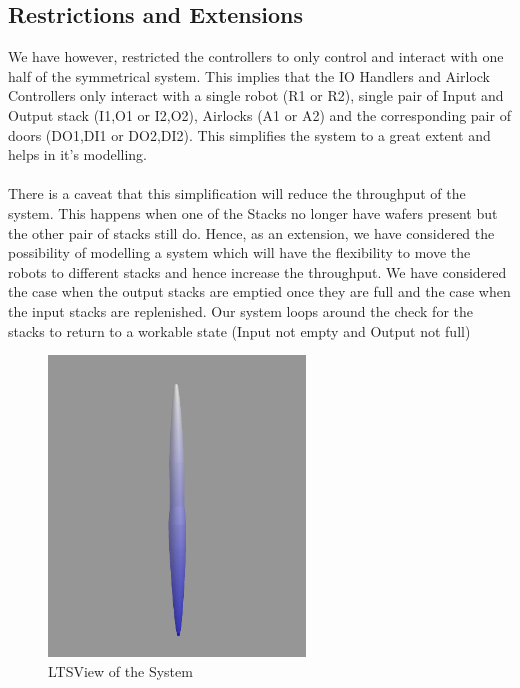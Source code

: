 \documentclass[a4paper,12pt]{article}
\begin{document}
	\subsection{Restrictions and Extensions}
	We have however, restricted the controllers to only control and interact with one half of the symmetrical system. This implies that the IO Handlers and Airlock Controllers only interact with a single robot (R1 or R2), single pair of Input and Output stack (I1,O1 or I2,O2), Airlocks (A1 or A2) and the corresponding pair of doors (DO1,DI1 or DO2,DI2). This simplifies the system to a great extent and helps in it's modelling.
	\\
	\\There is a caveat that this simplification will reduce the throughput of the system. This happens when one of the Stacks no longer have wafers present but the other pair of stacks still do. Hence, as an extension, we have considered the possibility of modelling a system which will have the flexibility to move the robots to different stacks and hence increase the throughput. 
	We have considered the case when the output stacks are emptied once they are full and the case when the input stacks are replenished. Our system loops around the check for the stacks to return to a workable state (Input not empty and Output not full)
	\begin{figure}[ht]
		\centering
		\includegraphics[width=\textwidth, height=8cm]{3D-Model.png}
		\caption{LTSView of the System}
		\label{fig:ltsview}
	\end{figure}
	\newpage
\end{document}
